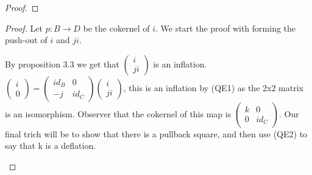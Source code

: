 \documentclass[12pt]{article}
\theoremstyle{definition}
\theoremstyle{remark}
\begin{document}
            \begin{proof}
                
            \end{proof}

            \begin{proof}
                Let $p:B\rightarrow D$ be the cokernel of $i$. We start the proof with forming the push-out of $i$ and $ji$.
                \begin{center}
                \end{center}
                By proposition 3.3 we get that $\begin{pmatrix}
                    i \\ ji
                \end{pmatrix}$ is an inflation. $\begin{pmatrix}
                    i \\ 0
                \end{pmatrix}=\begin{pmatrix}
                    id_B & 0 \\ -j & id_C
                \end{pmatrix}\begin{pmatrix}
                    i \\ ji
                \end{pmatrix}$, this is an inflation by (QE1) as the 2x2 matrix is an isomorphism. Observer that the cokernel of this map is $\begin{pmatrix}
                    k & 0 \\ 0 & id_C
                \end{pmatrix}$. Our final trich will be to show that there is a pullback square, and then use (QE2) to say that k is a deflation.
                \begin{center}
\end{center}
\end{proof}
\end{document}
